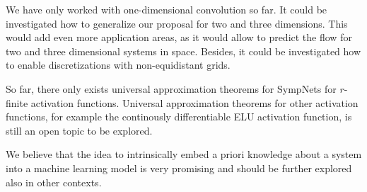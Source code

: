 \documentclass[twoside,a4paper]{article}
\begin{document}
We have only worked with one-dimensional convolution so far. It could be investigated
how to generalize our proposal for two and three dimensions. This would add
even more application areas, as it would allow to predict the
flow for two and three dimensional systems in space. Besides, it could be investigated
how to enable discretizations with non-equidistant grids.

So far, there only exists universal approximation theorems for SympNets 
for $r$-finite activation functions.
Universal approximation theorems for other activation functions, for example
the continously differentiable ELU activation function, is still an open topic to be explored.

We believe that the idea to intrinsically embed a priori knowledge about a system
into a machine learning model is very promising and should be further explored
also in other contexts.
\end{document}
